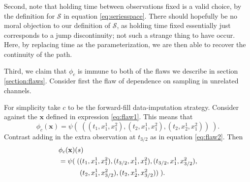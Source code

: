 \documentclass{article}
\newcommand{\seriesspace}{\mathcal{S}}
\begin{document}
Second, note that holding time between observations fixed is a valid choice, by the definition for $\seriesspace$ in equation \eqref{eq:seriesspace}. There should hopefully be no moral objection to our definition of $\seriesspace$, as holding time fixed essentially just corresponds to a jump discontinuity; not such a strange thing to have occur. Here, by replacing time as the parameterization, we are then able to recover the continuity of the path.

Third, we claim that $\phi_c$ is immune to both of the flaws we describe in section \ref{section:flaws}. Consider first the flaw of dependence on sampling in unrelated channels.

For simplicity take $c$ to be the forward-fill data-imputation strategy. Consider against the $\mathbf{x}$ defined in expression \eqref{eq:flaw1}. This means that
\begin{equation}\label{eq:causal1}
    \phi_c(\mathbf{x}) = \psi(\;((t_1, x_1^1, x_1^2), (t_2, x_1^1, x_1^2), (t_2, x_2^1, x_1^2))\;).
\end{equation}
Contrast adding in the extra observation at $t_{3/2}$ as in equation \eqref{eq:flaw2}. Then
\begin{align}
    &\phi_c(\mathbf{x})(s)\nonumber\\
    &=\psi(\;((t_1, x_1^1, x_1^2), (t_{3/2}, x_1^1, x_1^2), (t_{3/2}, x_1^1, x_{3/2}^2),\nonumber\\ &\hspace{3.1em}(t_2, x_1^1, x_{3/2}^2), (t_2, x_2^1, x_{3/2}^2))\;).\label{eq:causal2}
\end{align}
\end{document}
